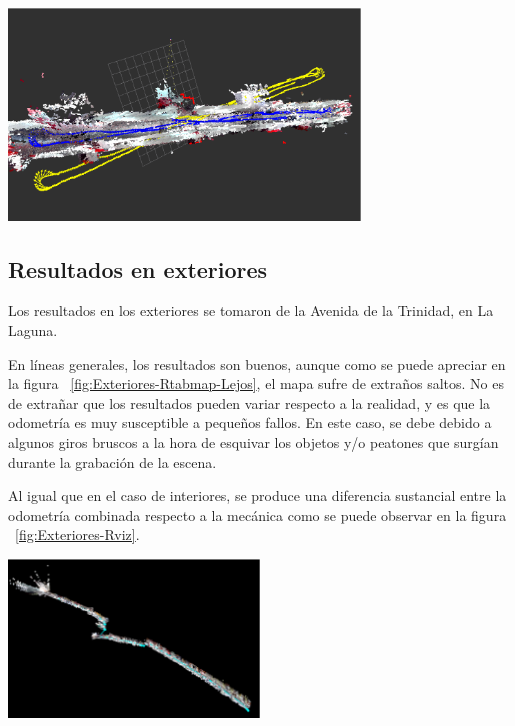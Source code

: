 \begin{minipage}{\linewidth}
    \centering
    \includegraphics[width=0.7\textwidth]{images/cap4/Interiores-rviz.eps}
    \label{fig:Interiores-Rviz}
\end{minipage}

\subsection{Resultados en exteriores}

Los resultados en los exteriores se tomaron de la Avenida de la Trinidad, en La
Laguna.

En líneas generales, los resultados son buenos, aunque como se puede apreciar en
la figura ~\ref{fig:Exteriores-Rtabmap-Lejos}, el mapa sufre de extraños saltos.
No es de extrañar que los resultados pueden variar respecto a la realidad, y es
que la odometría es muy susceptible a pequeños fallos. En este caso, se debe
debido a algunos giros bruscos a la hora de esquivar los objetos y/o peatones
que surgían durante la grabación de la escena.

Al igual que en el caso de interiores, se produce una diferencia sustancial
entre la odometría combinada respecto a la mecánica como se puede observar en la
figura ~\ref{fig:Exteriores-Rviz}.

\begin{minipage}{\linewidth}
    \centering
    \includegraphics[width=0.5\textwidth]{images/cap4/Exteriores-rtabmap-lejos.eps}
    \label{fig:Exteriores-Rtabmap-Lejos}
\end{minipage}

